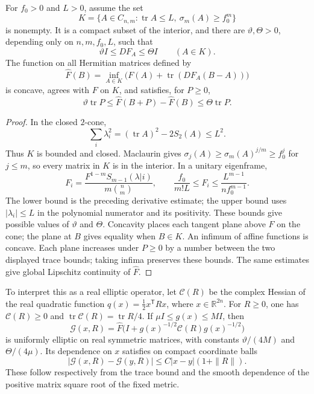 \begin{lemma}\label{draft:603-uniform-elliptic-extension}
For $f_0>0$ and $L>0$, assume the set
\[
 K=\{A\in C_{n,m}:\operatorname{tr}A\leq L,
                         \ \sigma_m(A)\geq f_0^m\}
\]
is nonempty. It is a compact subset of the interior, and there are
$\vartheta,\Theta>0$, depending only on $n,m,f_0,L$, such that
\[
 \vartheta I\leq DF_A\leq\Theta I\qquad(A\in K).
\]
The function on all Hermitian matrices defined by
\[
 \widehat F(B)=\inf_{A\in K}
       \bigl(F(A)+\operatorname{tr}(DF_A(B-A))\bigr)
\]
is concave, agrees with $F$ on $K$, and satisfies, for $P\geq0$,
\[
 \vartheta\operatorname{tr}P\leq
       \widehat F(B+P)-\widehat F(B)
       \leq\Theta\operatorname{tr}P.
\]
\end{lemma}
\begin{proof}
In the closed $2$-cone,
\[
 \sum_i\lambda_i^2=(\operatorname{tr}A)^2-2S_2(A)
                          \leq L^2.
\]
Thus $K$ is bounded and closed. Maclaurin gives
$\sigma_j(A)\geq\sigma_m(A)^{j/m}\geq f_0^j$ for $j\leq m$,
so every matrix in $K$ is in the interior. In a unitary eigenframe,
\[
 F_i=\frac{F^{1-m}S_{m-1}(\lambda|i)}{m\binom nm},
 \qquad
 \frac{f_0}{m!L}\leq F_i\leq
                 \frac{L^{m-1}}{n f_0^{m-1}}.
\]
The lower bound is the preceding derivative estimate; the upper bound
uses $|\lambda_i|\leq L$ in the polynomial numerator and its positivity.
These bounds give possible values of $\vartheta$ and $\Theta$.
Concavity places each tangent plane above $F$ on the cone; the plane
at $B$ gives equality when $B\in K$. An infimum of affine functions is
concave. Each plane increases under $P\geq0$ by a number between the
two displayed trace bounds; taking infima preserves these bounds.
The same estimates give global Lipschitz continuity of $\widehat F$.
\end{proof}

To interpret this as a real elliptic operator, let $\mathcal C(R)$ be
the complex Hessian of the real quadratic function
$q(x)=\frac12 x^{\mathsf T}Rx$, where $x\in\mathbb R^{2n}$.
For $R\geq0$, one has $\mathcal C(R)\geq0$ and
$\operatorname{tr}\mathcal C(R)=\operatorname{tr}R/4$.
If $\mu I\leq g(x)\leq MI$, then
\[
 \mathcal G(x,R)=\widehat F
       \bigl(I+g(x)^{-1/2}\mathcal C(R)g(x)^{-1/2}\bigr)
\]
is uniformly elliptic on real symmetric matrices, with constants
$\vartheta/(4M)$ and $\Theta/(4\mu)$.
Its dependence on $x$ satisfies on compact coordinate balls
\[
 |\mathcal G(x,R)-\mathcal G(y,R)|
                      \leq C|x-y|(1+\|R\|).
\]
These follow respectively from the trace bound and the smooth dependence
of the positive matrix square root of the fixed metric.

